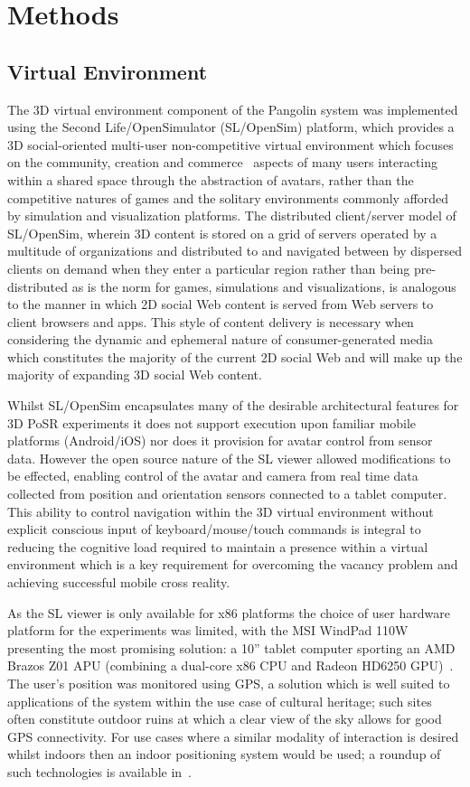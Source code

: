 \section{Methods}
\subsection{Virtual Environment}
The 3D virtual environment component of the Pangolin system was implemented using the Second Life/OpenSimulator (SL/OpenSim) platform, which provides a 3D social-oriented multi-user non-competitive virtual environment which focuses on the community, creation and commerce~\cite{Sevan2008} aspects of many users interacting within a shared space through the abstraction of avatars, rather than the competitive natures of games and the solitary environments commonly afforded by simulation and visualization platforms. The distributed client/server model of SL/OpenSim, wherein 3D content is stored on a grid of servers operated by a multitude of organizations and distributed to and navigated between by dispersed clients on demand when they enter a particular region rather than being pre-distributed as is the norm for games, simulations and visualizations, is analogous to the manner in which 2D social Web content is served from Web servers to client browsers and apps. This style of content delivery is necessary when considering the dynamic and ephemeral nature of consumer-generated media which constitutes the majority of the current 2D social Web and will make up the majority of expanding 3D social Web content.

Whilst SL/OpenSim encapsulates many of the desirable architectural features for 3D PoSR experiments it does not support execution upon familiar mobile platforms (Android/iOS) nor does it provision for avatar control from sensor data. However the open source nature of the SL viewer allowed modifications to be effected, enabling control of the avatar and camera from real time data collected from position and orientation sensors connected to a tablet computer. This ability to control navigation within the 3D virtual environment without explicit conscious input of keyboard/mouse/touch commands is integral to reducing the cognitive load required to maintain a presence within a virtual environment which is a key requirement for overcoming the vacancy problem and achieving successful mobile cross reality.

As the SL viewer is only available for x86 platforms the choice of user hardware platform for the experiments was limited, with the MSI WindPad 110W presenting the most promising solution: a 10'' tablet computer sporting an AMD Brazos Z01 APU (combining a dual-core x86 CPU and Radeon HD6250 GPU)~\cite{Micro-StarInt'lCo.}. The user's position was monitored using GPS, a solution which is well suited to applications of the system within the use case of cultural heritage; such sites often constitute outdoor ruins at which a clear view of the sky allows for good GPS connectivity. For use cases where a similar modality of interaction is desired whilst indoors then an indoor positioning system would be used; a roundup of such technologies is available in~\cite{Mautz2012}.

